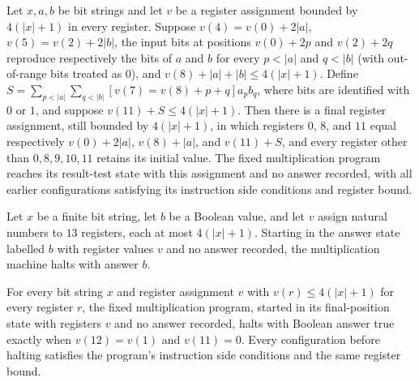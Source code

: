\begin{lemma}
\label{Complexity.mult_outer_loop}
\leanok
{}
Let $x,a,b$ be bit strings and let $v$ be a register assignment bounded by $4(|x|+1)$ in
every register. Suppose $v(4)=v(0)+2|a|$, $v(5)=v(2)+2|b|$, the input bits at positions
$v(0)+2p$ and $v(2)+2q$ reproduce respectively the bits of $a$ and $b$ for every $p<|a|$
and $q<|b|$ (with out-of-range bits treated as $0$), and $v(8)+|a|+|b|\le 4(|x|+1)$.
Define $S=\sum_{p<|a|}\sum_{q<|b|} [v(7)=v(8)+p+q]a_p b_q$, where bits are identified
with $0$ or $1$, and suppose $v(11)+S\le 4(|x|+1)$. Then there is a final register
assignment, still bounded by $4(|x|+1)$, in which registers $0$, $8$, and $11$ equal
respectively $v(0)+2|a|$, $v(8)+|a|$, and $v(11)+S$, and every register other than
$0,8,9,10,11$ retains its initial value. The fixed multiplication program reaches its
result-test state with this assignment and no answer recorded, with all earlier
configurations satisfying its instruction side conditions and register bound.
\end{lemma}

\begin{lemma}
\label{Complexity.mult_return}
\leanok
{}
Let $x$ be a finite bit string, let $b$ be a Boolean value, and let $v$ assign natural
numbers to $13$ registers, each at most $4(|x|+1)$. Starting in the answer state
labelled $b$ with register values $v$ and no answer recorded, the multiplication machine
halts with answer $b$.
\end{lemma}

\begin{lemma}
\label{Complexity.mult_finish}
\leanok
{}
For every bit string $x$ and register assignment $v$ with $v(r)\le 4(|x|+1)$ for every
register $r$, the fixed multiplication program, started in its final-position state with
registers $v$ and no answer recorded, halts with Boolean answer true exactly when
$v(12)=v(1)$ and $v(11)=0$. Every configuration before halting satisfies the program's
instruction side conditions and the same register bound.
\end{lemma}

